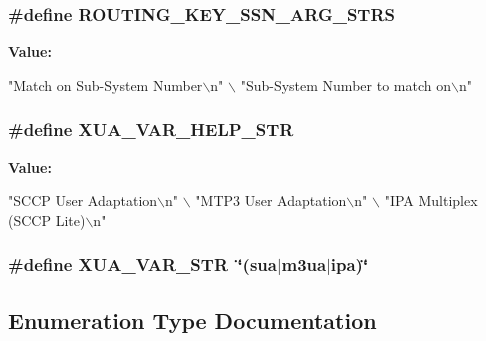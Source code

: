 \subsubsection[{R\+O\+U\+T\+I\+N\+G\+\_\+\+K\+E\+Y\+\_\+\+S\+S\+N\+\_\+\+A\+R\+G\+\_\+\+S\+T\+RS}]{\setlength{\rightskip}{0pt plus 5cm}\#define R\+O\+U\+T\+I\+N\+G\+\_\+\+K\+E\+Y\+\_\+\+S\+S\+N\+\_\+\+A\+R\+G\+\_\+\+S\+T\+RS}\label{osmo__ss7__vty_8c_abb323199bb551576ad102102c64df8e4}
{\bfseries Value\+:}
\begin{DoxyCode}
\textcolor{stringliteral}{"Match on Sub-System Number\(\backslash\)n"} \(\backslash\)
        \textcolor{stringliteral}{"Sub-System Number to match on\(\backslash\)n"}
\end{DoxyCode}
\subsubsection[{X\+U\+A\+\_\+\+V\+A\+R\+\_\+\+H\+E\+L\+P\+\_\+\+S\+TR}]{\setlength{\rightskip}{0pt plus 5cm}\#define X\+U\+A\+\_\+\+V\+A\+R\+\_\+\+H\+E\+L\+P\+\_\+\+S\+TR}\label{osmo__ss7__vty_8c_a949d5f69b175d77ee760da96301724c5}
{\bfseries Value\+:}
\begin{DoxyCode}
\textcolor{stringliteral}{"SCCP User Adaptation\(\backslash\)n"}         \(\backslash\)
        \textcolor{stringliteral}{"MTP3 User Adaptation\(\backslash\)n"}        \(\backslash\)
        \textcolor{stringliteral}{"IPA Multiplex (SCCP Lite)\(\backslash\)n"}
\end{DoxyCode}
\subsubsection[{X\+U\+A\+\_\+\+V\+A\+R\+\_\+\+S\+TR}]{\setlength{\rightskip}{0pt plus 5cm}\#define X\+U\+A\+\_\+\+V\+A\+R\+\_\+\+S\+TR~\char`\"{}(sua$\vert$m3ua$\vert$ipa)\char`\"{}}\label{osmo__ss7__vty_8c_ad33390e3572b10c583f9cf2aac606608}


\subsection{Enumeration Type Documentation}

